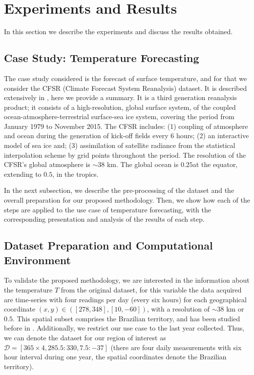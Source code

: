 \section{Experiments and Results}

In this section we describe the experiments and discuss the results obtained.

\subsection{Case Study: Temperature Forecasting}

The case study considered is the forecast of surface temperature, and for that we consider the CFSR (Climate Forecast System Reanalysis) dataset. It is described extensively in \cite{Saha2010}, here we provide a summary. It is a third generation reanalysis product; it consists of a high-resolution, global surface system, of the coupled ocean-atmosphere-terrestrial surface-sea ice system, covering the period from January 1979 to November 2015. The CFSR includes: (1) coupling of atmosphere and ocean during the generation of kick-off fields every 6 hours; (2) an interactive model of sea ice and; (3) assimilation of satellite radiance from the statistical interpolation scheme by grid points throughout the period. The resolution of the CFSR's global atmosphere is $\sim 38$ km. The global ocean is $0.25$\textdegree at the equator, extending to $0.5$\textdegree, in the tropics. 

In the next subsection, we describe the pre-processing of the dataset and the overall preparation for our proposed methodology. Then, we show how each of the steps are applied to the use case of temperature forecasting, with the corresponding presentation and analysis of the results of each step.

\subsection{Dataset Preparation and Computational Environment}
\label{sec:DatasetPreparation}

To validate the proposed methodology, we are interested in the information about the temperature $T$ from the original dataset, for this variable the data acquired are time-series with four readings per day (every six hours) for each geographical coordinate $(x,y)\in ([278, 348], [10, -60])$, with a resolution of $\sim 38$ km or $0.5$\textdegree. This spatial subset comprises the Brazilian territory, and has been studied before in \cite{Souto2018}. Additionally, we restrict our use case to the last year collected. Thus, we can denote the dataset for our region of interest as $\mathcal{D} = [ 365\times 4, 285.5:330, 7.5:-37]$ (there are four daily measurements with six hour interval during one year, the spatial coordinates denote the Brazilian territory). 

